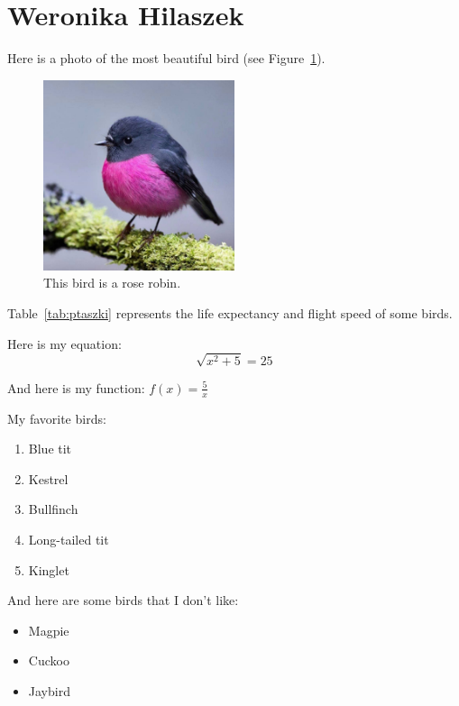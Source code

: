 \section{Weronika Hilaszek}
\label{sec:whilaszek}
\vspace{0.4cm}

Here is a photo of the most beautiful bird (see Figure~\ref{fig:ptaszek}).

\begin{figure}[htbp]
    \centering
    \includegraphics[width=0.5\textwidth]{Pictures/4_WHilaszek.jpg}
    \caption{This bird is a rose robin.}
    \label{fig:ptaszek}
\end{figure}
\vspace{1.0cm}

Table~\ref{tab:ptaszki} represents the life expectancy and flight speed of some birds.


\vspace{0.8cm}

Here is my equation: \[\sqrt{x^2+5}=25\]

And here is my function: $ f(x) = \frac{5}{x} $
\vspace{3.8cm}

My favorite birds:
\begin{enumerate}
    \item Blue tit
    \item Kestrel
    \item Bullfinch
    \item Long-tailed tit
    \item Kinglet
\end{enumerate}

\vspace{0.8cm}

And here are some birds that I don't like:
\begin{itemize}
\renewcommand{\labelitemi}{$-$}
    \item Magpie
    \item Cuckoo
    \item Jaybird
\end{itemize}

